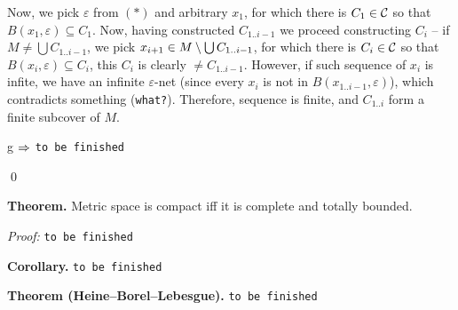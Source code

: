 Now, we pick $\varepsilon$ from $(*)$ and arbitrary $x_1$, for which there
is $C_1 \in \cal C$ so that $B(x_1,\varepsilon)\subseteq C_1$. Now, having 
constructed $C_{1..i-1}$ we proceed constructing $C_i$ -- if $M\neq \bigcup
C_{1..i-1}$, we pick $x_{i+1} \in M\setminus \bigcup C_{1..i-1}$, for which there 
is $C_i \in \cal C$ so that $B(x_i,\varepsilon)\subseteq C_i$, this $C_i$ 
is clearly $\neq C_{1..i-1}$. However, if such sequence of $x_i$ is infite, 
we have an infinite $\varepsilon$-net (since every $x_i$ is not in 
$B(x_{1..i-1},\varepsilon)$), which contradicts something ({\tt what?}). 
Therefore, sequence is finite, and $C_{1..i}$ form a finite subcover of $M$.

\smallskip

g $\Rightarrow$ {\tt to be finished}

\qed
\medskip

{\bf Theorem.} Metric space is compact iff it is complete and totally bounded.

{\it Proof:} {\tt to be finished}

{\bf Corollary.} {\tt to be finished}

{\bf Theorem (Heine--Borel--Lebesgue).} {\tt to be finished}
